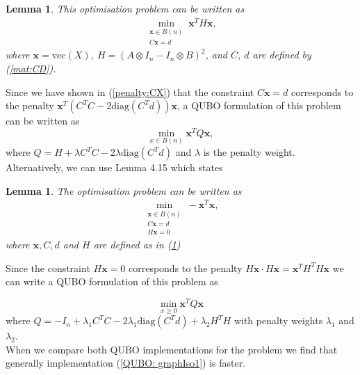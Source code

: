 \documentclass{article}
\newtheorem{lem}[prop]{Lemma}
\begin{document}
\begin{lem}\label{lem:qubo1}
    \cite[p.~8]{klus2023continuous} This optimisation problem can be written as \begin{align*}
    \min_{\substack{\mathbf{x} \in B(n) \\ C\mathbf{x} = d}} \mathbf{x}^T H\mathbf{x},
    \end{align*}
    where \(\mathbf{x} = \text{vec}(X)\), \(H = (A \otimes I_n - I_n \otimes B)^2\), and \(C\), \(d\) are defined by (\ref{mat:CD}).
\end{lem}

\noindent Since we have shown in (\ref{penalty:CX}) that the constraint \(C\mathbf{x} = d\) corresponds to the penalty \(\mathbf{x}^T(C^T C - 2\text{diag}(C^T d))\mathbf{x}\), a QUBO formulation of this problem can be written as 
\begin{equation}\label{QUBO: graphIso1}
	\min_{x \in B(n)} \mathbf{x}^T Q \mathbf{x},
\end{equation}
where \(Q = H + \lambda C^T C - 2\lambda\text{diag}(C^T d)\) and \(\lambda\) is the penalty weight.\\

\noindent Alternatively, we can use Lemma 4.15 which states
\begin{lem}
	\cite[p.~13]{klus2023continuous} The optimisation problem can be written as \begin{align*}
		\min_{\substack{\mathbf{x} \in B(n) \\ C\mathbf{x} = d \\ H\mathbf{x}=0}} -\mathbf{x}^T\mathbf{x},
	\end{align*}
	where \(\mathbf{x}, C, d\) and \(H\) are defined as in (\ref{lem:qubo1})
\end{lem}

\noindent Since the constraint \(H\mathbf{x} = 0\) corresponds to the penalty \(H\mathbf{x} \cdot H\mathbf{x} =  \mathbf{x}^T H^T H  \mathbf{x}\) we can write a QUBO formulation of this problem as

\begin{equation}\label{QUBO: graphIso2}
	\min_{x \geq 0} \mathbf{x}^T Q \mathbf{x}
\end{equation}
where \(Q = -I_n + \lambda_1 C^T C - 2\lambda_1\text{diag}(C^T d) + \lambda_2 H^T H\) with penalty weights \(\lambda_1\) and \(\lambda_2\).\\

\noindent When we compare both QUBO implementations for the problem we find that generally implementation (\ref{QUBO: graphIso1}) is faster.
\end{document}
